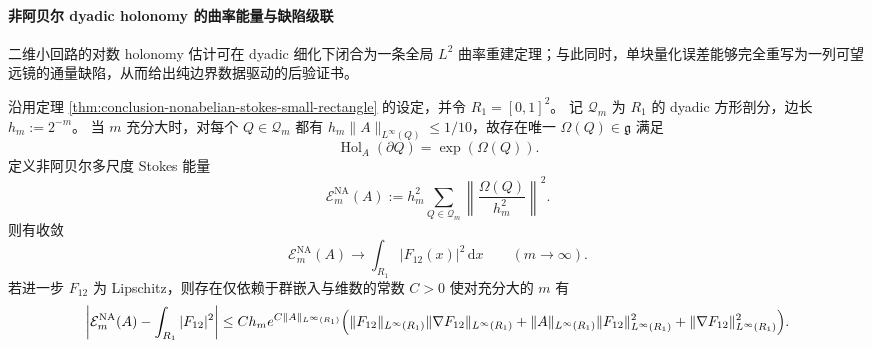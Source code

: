 \paragraph{非阿贝尔 dyadic holonomy 的曲率能量与缺陷级联}
二维小回路的对数 holonomy 估计可在 dyadic 细化下闭合为一条全局 \(L^2\) 曲率重建定理；与此同时，单块量化误差能够完全重写为一列可望远镜的通量缺陷，从而给出纯边界数据驱动的后验证书。

\begin{theorem}\label{thm:conclusion-nonabelian-dyadic-stokes-energy-reconstruction}
沿用定理 \ref{thm:conclusion-nonabelian-stokes-small-rectangle} 的设定，并令 \(R_1=[0,1]^2\)。
记 \(\mathcal Q_m\) 为 \(R_1\) 的 dyadic 方形剖分，边长 \(h_m:=2^{-m}\)。
当 \(m\) 充分大时，对每个 \(Q\in\mathcal Q_m\) 都有 \(h_m\|A\|_{L^\infty(Q)}\le 1/10\)，故存在唯一 \(\Omega(Q)\in\mathfrak g\) 满足
\[
\operatorname{Hol}_A(\partial Q)=\exp(\Omega(Q)).
\]
定义非阿贝尔多尺度 Stokes 能量
\[
\mathcal E_m^{\mathrm{NA}}(A)
:=
h_m^2\sum_{Q\in\mathcal Q_m}
\left\|
\frac{\Omega(Q)}{h_m^2}
\right\|^2.
\]
则有收敛
\[
\mathcal E_m^{\mathrm{NA}}(A)\longrightarrow \int_{R_1}|F_{12}(x)|^2\,\mathrm d x
\qquad (m\to\infty).
\]
若进一步 \(F_{12}\) 为 Lipschitz，则存在仅依赖于群嵌入与维数的常数 \(C>0\) 使对充分大的 \(m\) 有
\[
\left|
\mathcal E_m^{\mathrm{NA}}(A)-\int_{R_1}|F_{12}|^2
\right|
\le
C h_m e^{C\|A\|_{L^\infty(R_1)}}
\Bigl(
\|F_{12}\|_{L^\infty(R_1)}\|\nabla F_{12}\|_{L^\infty(R_1)}
+\|A\|_{L^\infty(R_1)}\|F_{12}\|_{L^\infty(R_1)}^2
+\|\nabla F_{12}\|_{L^\infty(R_1)}^2
\Bigr).
\]
\end{theorem}
